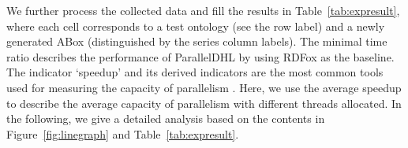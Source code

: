 
We further process the collected data and fill the results in Table~\ref{tab:expresult}, where each cell corresponds
to a test ontology (see the row label) and a newly generated ABox
(distinguished by the series column labels). 
The minimal time ratio describes the performance of ParallelDHL by using RDFox as the baseline.
The indicator `speedup' and its derived indicators are the most common tools used for measuring the capacity of parallelism \cite{MotikNPHO14,KazakovKS14,UrbaniKMHB12}.
Here, we use the average speedup \cite{ichiyoshiK92} to describe the average capacity of parallelism with different
threads allocated.
In the following, we give a detailed analysis based on the contents in Figure~\ref{fig:linegraph} and Table~\ref{tab:expresult}.


